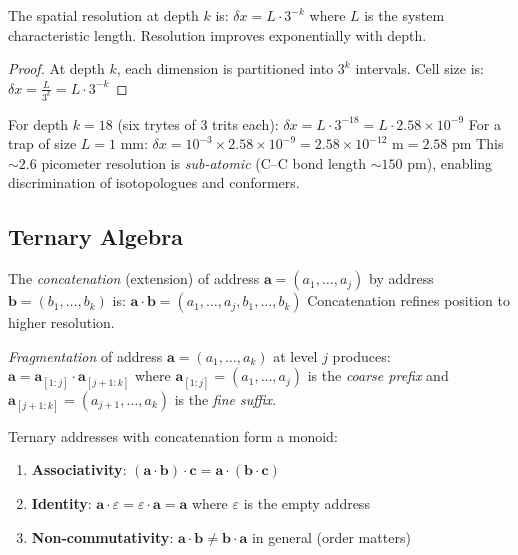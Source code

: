 \begin{corollary}
\label{cor:resolution}
The spatial resolution at depth $k$ is:
$
\delta x = L \cdot 3^{-k}
$
where $L$ is the system characteristic length. Resolution improves exponentially with depth.
\end{corollary}

\begin{proof}
At depth $k$, each dimension is partitioned into $3^k$ intervals. Cell size is:
$
\delta x = \frac{L}{3^k} = L \cdot 3^{-k}
$
\end{proof}

\begin{example}
\label{ex:resolution}
For depth $k = 18$ (six trytes of 3 trits each):
$
\delta x = L \cdot 3^{-18} = L \cdot 2.58 \times 10^{-9}
$
For a trap of size $L = 1$ mm:
$
\delta x = 10^{-3} \times 2.58 \times 10^{-9} = 2.58 \times 10^{-12} \text{ m} = 2.58 \text{ pm}
$
This $\sim 2.6$ picometer resolution is \emph{sub-atomic} (C–C bond length $\sim 150$ pm), enabling discrimination of isotopologues and conformers.
\end{example}



\subsection{Ternary Algebra}

\begin{definition}
\label{def:concatenation}
The \emph{concatenation} (extension) of address $\mathbf{a} = (a_1, \ldots, a_j)$ by address $\mathbf{b} = (b_1, \ldots, b_k)$ is:
$
\mathbf{a} \cdot \mathbf{b} = (a_1, \ldots, a_j, b_1, \ldots, b_k)
$
Concatenation refines position to higher resolution.
\end{definition}

\begin{definition}
\label{def:fragmentation}
\emph{Fragmentation} of address $\mathbf{a} = (a_1, \ldots, a_k)$ at level $j$ produces:
$
\mathbf{a} = \mathbf{a}_{[1:j]} \cdot \mathbf{a}_{[j+1:k]}
$
where $\mathbf{a}_{[1:j]} = (a_1, \ldots, a_j)$ is the \emph{coarse prefix} and $\mathbf{a}_{[j+1:k]} = (a_{j+1}, \ldots, a_k)$ is the \emph{fine suffix}.
\end{definition}

\begin{proposition}
\label{prop:monoid}
Ternary addresses with concatenation form a monoid:
\begin{enumerate}
    \item \textbf{Associativity}: $(\mathbf{a} \cdot \mathbf{b}) \cdot \mathbf{c} = \mathbf{a} \cdot (\mathbf{b} \cdot \mathbf{c})$
    \item \textbf{Identity}: $\mathbf{a} \cdot \varepsilon = \varepsilon \cdot \mathbf{a} = \mathbf{a}$ where $\varepsilon$ is the empty address
    \item \textbf{Non-commutativity}: $\mathbf{a} \cdot \mathbf{b} \neq \mathbf{b} \cdot \mathbf{a}$ in general (order matters)
\end{enumerate}
\end{proposition}

